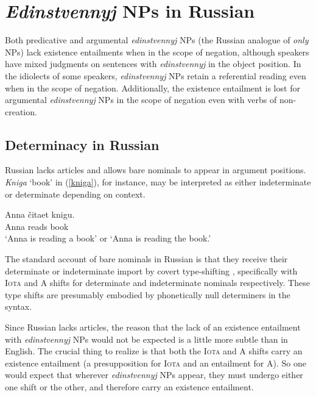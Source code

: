 \section{\textit{Edinstvennyj} NPs in Russian \label{sec:anti-uniqueness-russian}}
Both predicative and argumental \textit{edinstvennyj} NPs (the Russian analogue of \textit{only} NPs) lack existence entailments when in the scope of negation, although speakers have mixed judgments on sentences with \textit{edinstvennyj} in the object position. In the idiolects of some speakers, \textit{edinstvennyj} NPs retain a referential reading even when in the scope of negation. Additionally, the existence entailment is lost for argumental \textit{edinstvennyj} NPs in the scope of negation even with verbs of non-creation.

\subsection{Determinacy in Russian}
Russian lacks articles and allows bare nominals to appear in argument positions. \textit{Kniga} `book' in (\ref{kniga}), for instance, may be interpreted as either indeterminate or determinate depending on context.

\begin{exe}
	\ex \label{kniga} \gll Anna \v{c}itaet knigu.\\
	Anna reads book\\
	\glt `Anna is reading a book' or `Anna is reading the book.'
\end{exe}

The standard account of bare nominals in Russian is that they receive their determinate or indeterminate import by covert type-shifting \citep{chierchia98}, specifically with  \textsc{Iota} and \textsc{A} shifts for determinate and indeterminate nominals respectively. These type shifts are presumably embodied by phonetically null determiners in the syntax.

Since Russian lacks articles, the reason that the lack of an existence entailment with \textit{edinstvennyj} NPs would not be expected is a little more subtle than in English. The crucial thing to realize is that both the \textsc{Iota} and \textsc{A} shifts carry an existence entailment (a presupposition for \textsc{Iota} and an entailment for \textsc{A}). So one would expect that wherever \textit{edinstvennyj} NPs appear, they must undergo either one shift or the other, and therefore carry an existence entailment.

